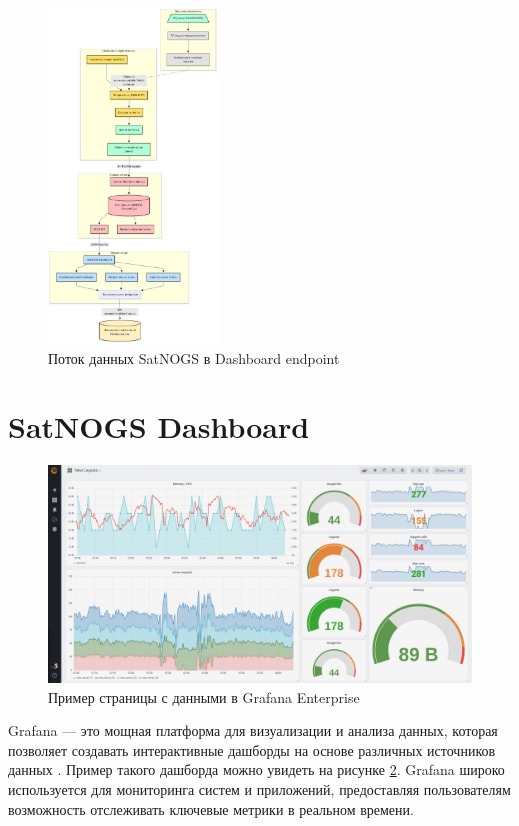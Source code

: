 \documentclass[14pt, a4paper]{bsu}
\begin{document}
\begin{figure}[htbp] \centering
	\includegraphics[width=0.4\textwidth]{satnogs_data_flow} \caption{Поток
		данных SatNOGS в Dashboard endpoint} \label{fig:satnogs_data_flow}
\end{figure}

\section{SatNOGS Dashboard}

\begin{figure}[htbp] \centering
	\includegraphics[width=1.0\textwidth]{grafana_example} \caption{Пример
		страницы с данными в Grafana Enterprise} \label{fig:grafana_example}
\end{figure}

Grafana — это мощная платформа для визуализации и анализа данных, которая
позволяет создавать интерактивные дашборды на основе различных источников
данных \cite{grafana_docs}. Пример такого дашборда можно увидеть на рисунке
\ref{fig:grafana_example}. Grafana широко используется для мониторинга систем
и приложений, предоставляя пользователям возможность отслеживать ключевые
метрики в реальном времени.
\end{document}
